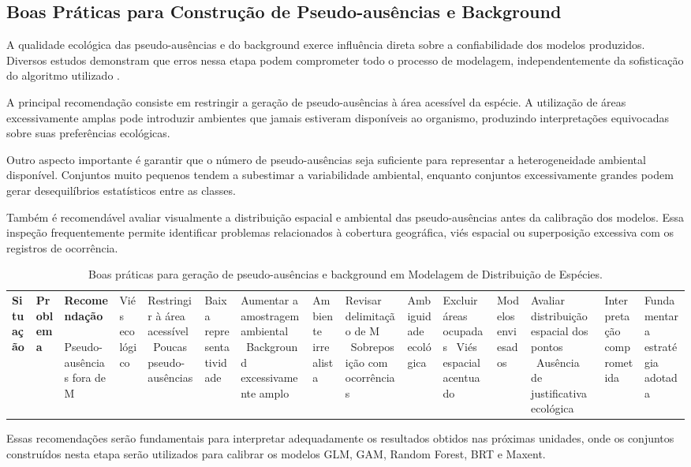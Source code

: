 \subsection{Boas Práticas para Construção de Pseudo-ausências e Background}

A qualidade ecológica das pseudo-ausências e do background exerce influência direta sobre a confiabilidade dos modelos produzidos. Diversos estudos demonstram que erros nessa etapa podem comprometer todo o processo de modelagem, independentemente da sofisticação do algoritmo utilizado \citep{barbet2012selecting, zurell2020standard}.

A principal recomendação consiste em restringir a geração de pseudo-ausências à área acessível da espécie. A utilização de áreas excessivamente amplas pode introduzir ambientes que jamais estiveram disponíveis ao organismo, produzindo interpretações equivocadas sobre suas preferências ecológicas.

Outro aspecto importante é garantir que o número de pseudo-ausências seja suficiente para representar a heterogeneidade ambiental disponível. Conjuntos muito pequenos tendem a subestimar a variabilidade ambiental, enquanto conjuntos excessivamente grandes podem gerar desequilíbrios estatísticos entre as classes.

Também é recomendável avaliar visualmente a distribuição espacial e ambiental das pseudo-ausências antes da calibração dos modelos. Essa inspeção frequentemente permite identificar problemas relacionados à cobertura geográfica, viés espacial ou superposição excessiva com os registros de ocorrência.

\begin{table}[H]
	\centering
	\caption{Boas práticas para geração de pseudo-ausências e background em Modelagem de Distribuição de Espécies.}
	\label{tab:boas_praticas_pseudoausencias}
	\begin{tabular}{p{4.5cm}p{4.5cm}p{5.5cm}}
		\toprule
		\textbf{Situação} & \textbf{Problema} & \textbf{Recomendação} \
		\midrule
		Pseudo-ausências fora de M & Viés ecológico & Restringir à área acessível \
		Poucas pseudo-ausências & Baixa representatividade & Aumentar a amostragem ambiental \
		Background excessivamente amplo & Ambiente irrealista & Revisar delimitação de M \
		Sobreposição com ocorrências & Ambiguidade ecológica & Excluir áreas ocupadas \
		Viés espacial acentuado & Modelos enviesados & Avaliar distribuição espacial dos pontos \
		Ausência de justificativa ecológica & Interpretação comprometida & Fundamentar a estratégia adotada \
		\bottomrule
	\end{tabular}
\end{table}

Essas recomendações serão fundamentais para interpretar adequadamente os resultados obtidos nas próximas unidades, onde os conjuntos construídos nesta etapa serão utilizados para calibrar os modelos GLM, GAM, Random Forest, BRT e Maxent.
